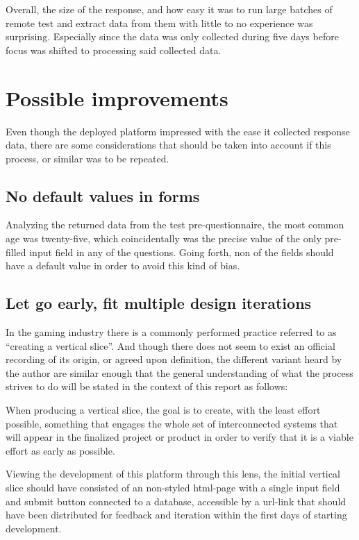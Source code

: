   Overall, the size of the response, and how easy it was to run large batches
  of remote test and extract data from them with little to no experience was
  surprising. Especially since the data was only collected during five days
  before focus was shifted to processing said collected data.


\section{Possible improvements}

  Even though the deployed platform impressed with the ease it collected
  response data, there are some considerations that should be taken into
  account if this process, or similar was to be repeated.

  \subsection{No default values in forms}\label{label_validity_default_age}

  Analyzing the returned data from the test pre-questionnaire, the most common
  age was twenty-five, which coincidentally was the precise value of the only
  pre-filled input field in any of the questions. Going forth, non of the
  fields should have a default value in order to avoid this kind of bias.

  \subsection{Let go early, fit multiple design iterations}

  In the gaming industry there is a commonly performed practice referred to as
  ``creating a vertical slice''. And though there does not seem to exist an
  official recording of its origin, or agreed upon definition, the different
  variant heard by the author are similar enough that the general understanding
  of what the process strives to do will be stated in the context of this
  report as follows:

  When producing a vertical slice, the goal is to create, with the least effort
  possible, something that engages the whole set of interconnected systems that
  will appear in the finalized project or product in order to verify that it is
  a viable effort as early as possible.

  Viewing the development of this platform through this lens, the initial vertical
  slice should have consisted of an non-styled html-page with a single input
  field and submit button connected to a database, accessible by a url-link
  that should have been distributed for feedback and iteration within the first
  days of starting development.

